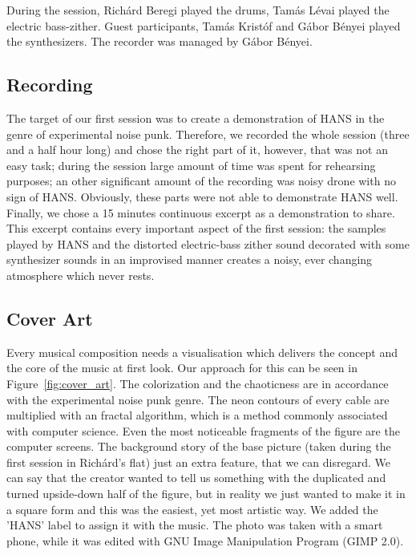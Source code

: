 \documentclass[12pt,a4paper,oneside]{report}
\begin{document}
During the session, Richárd Beregi played the drums, Tamás Lévai played
the electric bass-zither. Guest participants, Tamás Kristóf and Gábor
Bényei played the synthesizers. The recorder was managed by Gábor
Bényei.

\subsection*{Recording}
\label{ss:recording}
The target of our first session was to create a demonstration of HANS
in the genre of experimental noise punk. Therefore, we recorded the
whole session (three and a half hour long) and chose the right part of
it, however, that was not an easy task; during the session large
amount of time was spent for rehearsing purposes; an other significant
amount of the recording was noisy drone with no sign of
HANS. Obviously, these parts were not able to demonstrate HANS
well. Finally, we chose a 15 minutes continuous excerpt as a
demonstration to share. This excerpt contains every important aspect
of the first session: the samples played by HANS and the distorted
electric-bass zither sound decorated with some synthesizer sounds in
an improvised manner creates a noisy, ever changing atmosphere which
never rests.

\subsection*{Cover Art}
Every musical composition needs a visualisation which delivers the
concept and the core of the music at first look. Our approach for this
can be seen in Figure~\ref{fig:cover_art}. The colorization and the
chaoticness are in accordance with the experimental noise punk
genre. The neon contours of every cable are multiplied with an fractal
algorithm, which is a method commonly associated with computer
science. Even the most noticeable fragments of the figure are the
computer screens. The background story of the base picture (taken
during the first session in Richárd's flat) just an extra feature,
that we can disregard. We can say that the creator wanted to tell us
something with the duplicated and turned upside-down half of the
figure, but in reality we just wanted to make it in a square form and
this was the easiest, yet most artistic way. We added the 'HANS' label
to assign it with the music. The photo was taken with a smart phone,
while it was edited with GNU Image Manipulation Program (GIMP 2.0).
\end{document}
